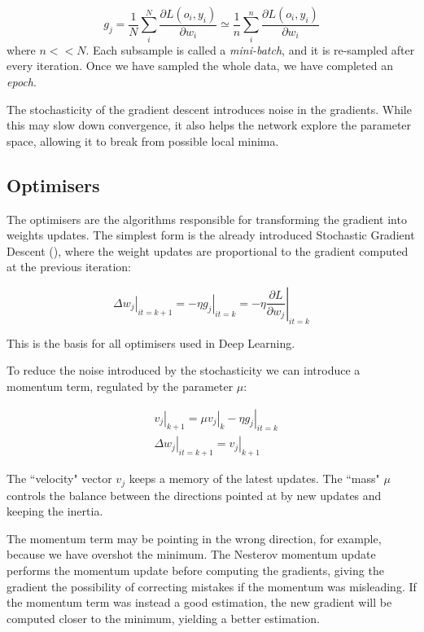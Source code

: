 \begin{equation*}
g_j = \frac{1}{N} \sum_i^N \frac{\partial L\left(o_i, y_i\right)}{\partial w_i} \simeq \frac{1}{n} \sum_i^n \frac{\partial L\left(o_i, y_i\right)}{\partial w_i}
\end{equation*}
where $n << N$.
Each subsample is called a \emph{mini-batch}, and it is re-sampled after every iteration. 
Once we have sampled the whole data, we have completed an \emph{epoch}.

The stochasticity of the gradient descent introduces noise in the gradients.
While this may slow down convergence, it also helps the network explore the parameter space, allowing it to break from possible local minima.

\subsection{Optimisers}
The optimisers are the algorithms responsible for transforming the gradient into weights updates.
The simplest form is the already introduced Stochastic Gradient Descent (\SGD), \sidenote{\SGD}
where the weight updates are proportional to the gradient computed at the previous iteration:

\begin{equation*}
\left.\Delta w_j\right|_{it=k+1} = - \left.\eta g_j\right|_{it=k} = - \eta \left.\frac{\partial L}{\partial w_j}\right|_{it=k}
\end{equation*}

This is the basis for all optimisers used in Deep Learning.


To reduce the noise introduced by the stochasticity we can introduce a momentum term, regulated by the parameter $\mu$:

\begin{align*}
&\left.v_j\right|_{k+1} = \mu \left. v_j\right|_{k} - \left.\eta g_j\right|_{it=k}\\
&\left.\Delta w_j\right|_{it=k+1} = \left.v_j\right|_{k+1}
\end{align*}

The ``velocity" vector $v_j$ keeps a memory of the latest updates.
The ``mass" $\mu$ controls the balance between the directions pointed at by new updates and keeping the inertia.

The momentum term may be pointing in the wrong direction, for example, because we have overshot the minimum. 
The Nesterov momentum update~\citep{nag} performs the momentum update before computing the gradients, giving the gradient the possibility of correcting mistakes if the momentum was misleading.
If the momentum term was instead a good estimation, the new gradient will be computed closer to the minimum, yielding a better estimation.

